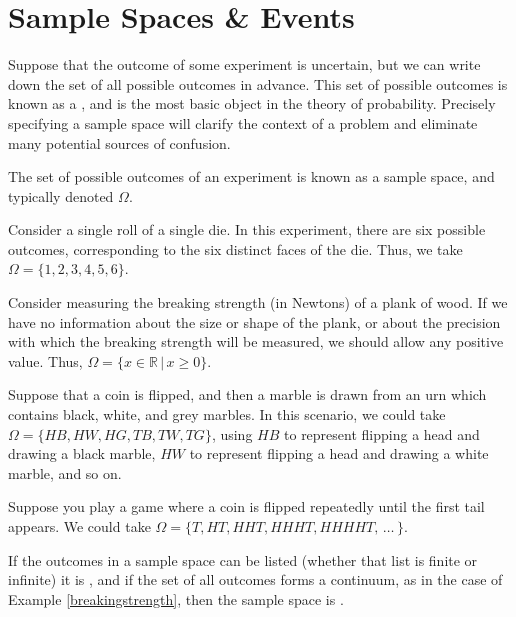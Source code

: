 \section{Sample Spaces \& Events} \label{sec 1.1}

Suppose that the outcome of some experiment is uncertain, but we can write down the set of all possible outcomes in advance. This set of possible outcomes is known as a , and is the most basic object in the theory of probability. Precisely specifying a sample space will clarify the context of a problem and eliminate many potential sources of confusion.

\begin{definition} The set of possible outcomes of an experiment is known as a sample space, and typically denoted $\Omega$.
\end{definition}
\begin{examp}Consider a single roll of a single die. In this experiment, there are six possible outcomes, corresponding to the six distinct faces of the die. Thus, we take $\Omega = \{1,2,3,4,5,6\}$.
\end{examp}
\begin{examp}\label{breakingstrength}Consider measuring the breaking strength (in Newtons) of a plank of wood. If we have no information about the size or shape of the plank, or about the precision with which the breaking strength will be measured, we should allow any positive value. Thus, $\Omega = \{x \in \mathbb{R} \, | \, x \geq 0\}$.\end{examp}
\begin{examp}Suppose that a coin is flipped, and then a marble is drawn from an urn which contains black, white, and grey marbles. In this scenario, we could take $\Omega = \{HB,HW,HG,TB,TW,TG\}$, using $HB$ to represent flipping a head and drawing a black marble, $HW$ to represent flipping a head and drawing a white marble, and so on. \end{examp}
\begin{examp}\label{FlipUntilTail}Suppose you play a game where a coin is flipped repeatedly until the first tail appears. We could take $\Omega = \{T, HT, HHT, HHHT, HHHHT, \, \dots\, \}$. \end{examp}
\par
If the outcomes in a sample space can be listed (whether that list is finite or infinite) it is , and if the set of all outcomes forms a continuum, as in the case of Example \ref{breakingstrength}, then the sample space is .
